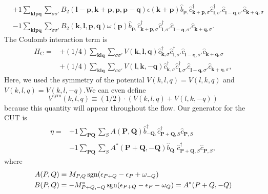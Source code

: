 \begin{align*}
	&+1 \sum_{ \mathbf{k} \mathbf{l} \mathbf{p} \mathbf{q} } \sum_{ \sigma \sigma' } B_2( \mathbf{l}-\mathbf{p}, \mathbf{k}+\mathbf{p}, \mathbf{p}, \mathbf{p}-\mathbf{q} )  \epsilon( \mathbf{k}+\mathbf{p} )   \hat{b}_{ \mathbf{p}, }^{\phantom{\dagger}} \hat{c}_{ \mathbf{k}+\mathbf{p}, \sigma }^\dagger  \hat{c}_{ \mathbf{l}, \sigma' }^\dagger  \hat{c}_{ \mathbf{l}-\mathbf{q}, \sigma' }^{\phantom{\dagger}} \hat{c}_{ \mathbf{k}+\mathbf{q}, \sigma }^{\phantom{\dagger}}  \\
	&-1 \sum_{ \mathbf{k} \mathbf{l} \mathbf{p} \mathbf{q} } \sum_{ \sigma \sigma' } B_2( \mathbf{k}, \mathbf{l}, \mathbf{p}, \mathbf{q} )  \omega( \mathbf{p} )   \hat{b}_{ \mathbf{p}, }^{\phantom{\dagger}} \hat{c}_{ \mathbf{k}+\mathbf{p}, \sigma }^\dagger  \hat{c}_{ \mathbf{l}, \sigma' }^\dagger  \hat{c}_{ \mathbf{l}-\mathbf{q}, \sigma' }^{\phantom{\dagger}} \hat{c}_{ \mathbf{k}+\mathbf{q}, \sigma }^{\phantom{\dagger}} 
. \end{align*}
The Coulomb interaction term is
\begin{align*}
	H_\mathrm{C} = 	&+(1/4) \sum_{ \mathbf{k} \mathbf{l} \mathbf{q} } \sum_{ \sigma \sigma' } V( \mathbf{k}, \mathbf{l}, \mathbf{q} )   \hat{c}_{ \mathbf{k}, \sigma }^\dagger  \hat{c}_{ \mathbf{l}, \sigma' }^\dagger  \hat{c}_{ \mathbf{l}-\mathbf{q}, \sigma' }^{\phantom{\dagger}} \hat{c}_{ \mathbf{k}+\mathbf{q}, \sigma }^{\phantom{\dagger}}  \\
	&+(1/4) \sum_{ \mathbf{k} \mathbf{l} \mathbf{q} } \sum_{ \sigma \sigma' } V( \mathbf{l}, \mathbf{k}, -\mathbf{q} )   \hat{c}_{ \mathbf{k}, \sigma }^\dagger  \hat{c}_{ \mathbf{l}, \sigma' }^\dagger  \hat{c}_{ \mathbf{l}-\mathbf{q}, \sigma' }^{\phantom{\dagger}} \hat{c}_{ \mathbf{k}+\mathbf{q}, \sigma }^{\phantom{\dagger}} 
,
\end{align*}
Here, we used the symmetry of the potential $V(k, l, q) = V(l, k, q)$ and $V(k, l, q) = V(k, l, -q)$.We can even define
\begin{equation}
	V^\mathrm{sym} (k, l, q) \equiv (1/2) \cdot (V(k, l, q) + V(l, k, -q))
\end{equation}
because this quantity will appear throughout the flow.
Our generator for the CUT is 
\begin{align*}
	\eta = 	&+1 \sum_{ \mathbf{P} \mathbf{Q} } \sum_{ S } A( \mathbf{P}, \mathbf{Q} )   \hat{b}_{ -\mathbf{Q}, }^\dagger  \hat{c}_{ \mathbf{P}+\mathbf{Q}, S }^\dagger  \hat{c}_{ \mathbf{P}, S }^{\phantom{\dagger}}  \\
	&-1 \sum_{ \mathbf{P} \mathbf{Q} } \sum_{ S } A^*( \mathbf{P}+\mathbf{Q}, -\mathbf{Q} )   \hat{b}_{ \mathbf{Q}, }^{\phantom{\dagger}} \hat{c}_{ \mathbf{P}+\mathbf{Q}, S }^\dagger  \hat{c}_{ \mathbf{P}, S }^{\phantom{\dagger}} 
, \end{align*}
where
\begin{align}
	A(P,Q) &= M_{P,Q} \operatorname{sgn} ( \epsilon_{P+Q} - \epsilon_P + \omega_{-Q} ) \\
	B(P,Q) &= -M_{P+Q,-Q}^* \operatorname{sgn} ( \epsilon_{P+Q} - \epsilon_P - \omega_Q ) = A^* (P+Q, -Q)
\end{align}

